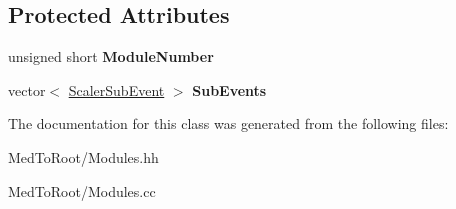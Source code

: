 \subsection*{Protected Attributes}
\begin{DoxyCompactItemize}
\item 
\mbox{\label{class_s_i_s_scaler_a4265cde97345c344d921d5eb1be0df50}} 
unsigned short {\bfseries Module\+Number}
\item 
\mbox{\label{class_s_i_s_scaler_a671eb8d858f9d2d4550fe76a89cf3095}} 
vector$<$ \hyperlink{class_scaler_sub_event}{Scaler\+Sub\+Event} $>$ {\bfseries Sub\+Events}
\end{DoxyCompactItemize}


The documentation for this class was generated from the following files\+:\begin{DoxyCompactItemize}
\item 
Med\+To\+Root/Modules.\+hh\item 
Med\+To\+Root/Modules.\+cc\end{DoxyCompactItemize}
